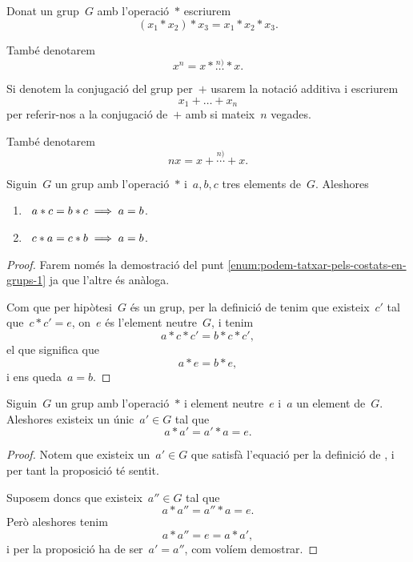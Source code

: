 \documentclass[../../main.tex]{subfiles}
\begin{document}
    \begin{notation}
        \label{notation:potencies-per-loperacio-repetida-en-un-grup}
        Donat un grup~\(G\) amb l'operació~\(\ast\) escriurem
        \[
            (x_{1}\ast x_{2})\ast x_{3}=x_{1}\ast x_{2}\ast x_{3}.
        \]

        També denotarem
        \[
            x^{n}=x\ast\overset{n)}{\dots}\ast x.
        \]

        Si denotem la conjugació del grup per~\(+\) usarem la notació additiva i escriurem
        \[
            x_{1}+\dots+x_{n}
        \]
        per referir-nos a la conjugació de~\(+\) amb si mateix~\(n\) vegades.

        També denotarem
        \[
            nx=x+\overset{n)}{\cdots}+ x.
        \]
    \end{notation}
    \begin{proposition}
        \label{prop:podem-tatxar-pels-costats-en-grups}
        Siguin~\(G\) un grup amb l'operació~\(\ast\) i~\(a,b,c\) tres elements de~\(G\).
        Aleshores
        \begin{enumerate}
            \item\label{enum:podem-tatxar-pels-costats-en-grups-1}~\(a\ast c=b\ast c\implies a=b\).
            \item\label{enum:podem-tatxar-pels-costats-en-grups-2}~\(c\ast a=c\ast b\implies a=b\).
        \end{enumerate}
    \end{proposition}
    \begin{proof}
        Farem només la demostració del punt \eqref{enum:podem-tatxar-pels-costats-en-grups-1} ja que l'altre és anàloga.

        Com que per hipòtesi~\(G\) és un grup, per la definició de  tenim que existeix~\(c'\) tal que~\(c\ast c'=e\), on~\(e\) és l'element neutre~\(G\), i tenim
        \[
            a\ast c\ast c'=b\ast c\ast c',
        \]
        el que significa que
        \[
            a\ast e=b\ast e,
        \]
        i ens queda~\(a=b\).
    \end{proof}
    \begin{proposition}
        \label{prop:unicitat-inversa-en-grups}
        Siguin~\(G\) un grup amb l'operació~\(\ast\) i element neutre~\(e\) i~\(a\) un element de~\(G\).
        Aleshores existeix un únic~\(a'\in G\) tal que
        \[
            a\ast a'=a'\ast a=e.
        \]
    \end{proposition}
    \begin{proof}
        Notem que existeix un~\(a'\in G\) que satisfà l'equació per la definició de , i per tant la proposició té sentit.

        Suposem doncs que existeix~\(a''\in G\) tal que
        \[
            a\ast a''=a''\ast a=e.
        \]
        Però aleshores tenim
        \[
            a\ast a''=e=a\ast a',
        \]
        i per la proposició  ha de ser~\(a'=a''\), com volíem demostrar.
    \end{proof}
\end{document}
